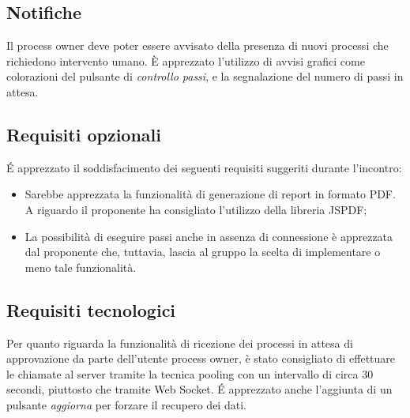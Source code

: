 \subsection{Notifiche}
Il process owner deve poter essere avvisato della presenza di nuovi processi che richiedono intervento umano. È apprezzato l'utilizzo di avvisi grafici come colorazioni del pulsante di \textit{controllo passi}, e la segnalazione del numero di passi in attesa.

\subsection{Requisiti opzionali}
É apprezzato il soddisfacimento dei seguenti requisiti suggeriti durante l'incontro:
\begin{itemize}
	\item Sarebbe apprezzata la funzionalità di generazione di report in formato PDF. A riguardo il 	proponente ha consigliato l'utilizzo della libreria JSPDF;
	\item La possibilità di eseguire passi anche in assenza di connessione è apprezzata dal proponente 			che, tuttavia, lascia al gruppo la scelta di implementare o meno tale funzionalità.
\end{itemize}


\subsection{Requisiti tecnologici}
Per quanto riguarda la funzionalità di ricezione dei processi in attesa di approvazione da parte dell'utente process owner, è stato consigliato di effettuare le chiamate al server tramite la tecnica pooling con un intervallo di circa 30 secondi, piuttosto che tramite Web Socket. É apprezzato  anche l'aggiunta di un pulsante \textit{aggiorna} per forzare il recupero dei dati.
